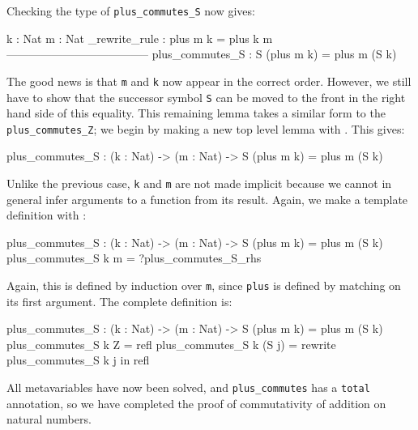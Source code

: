 Checking the type of \texttt{plus\_commutes\_S} now gives:

\begin{code}
  k : Nat
  m : Nat
  _rewrite_rule : plus m k = plus k m
--------------------------------------
plus_commutes_S : S (plus m k) = plus m (S k)
\end{code}

\noindent
The good news is that \texttt{m} and \texttt{k} now appear in the correct order.
However, we still have to show that the successor symbol \texttt{S} can be moved
to the front in the right hand side of this equality. This remaining lemma
takes a similar form to the \texttt{plus\_commutes\_Z}; we begin by making
a new top level lemma with \mklem{}. This gives:

\begin{code}
plus_commutes_S : (k : Nat) -> (m : Nat) -> S (plus m k) = plus m (S k)
\end{code}

\noindent
Unlike the previous case, \texttt{k} and \texttt{m} are not made implicit
because we cannot in general infer arguments to a function from its result.
Again, we make a template definition with \mkdef{}:

\begin{code}
plus_commutes_S : (k : Nat) -> (m : Nat) -> S (plus m k) = plus m (S k)
plus_commutes_S k m = ?plus_commutes_S_rhs
\end{code}

\noindent
Again, this is defined by induction over \texttt{m}, since \texttt{plus}
is defined by matching on its first argument. The complete definition is:

\begin{code}
plus_commutes_S : (k : Nat) -> (m : Nat) -> S (plus m k) = plus m (S k)
plus_commutes_S k Z = refl
plus_commutes_S k (S j) = rewrite plus_commutes_S k j in refl
\end{code}

\noindent
All metavariables have now been solved, and \texttt{plus\_commutes} has
a \texttt{total} annotation, so we have completed the proof of commutativity
of addition on natural numbers.
